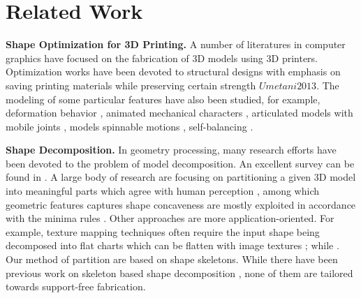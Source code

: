 \section{Related Work}

\textbf{Shape Optimization for 3D Printing.} A number of literatures in computer graphics have focused on the fabrication of 3D models using 3D printers. Optimization works have been devoted to structural designs with emphasis on saving printing materials while preserving certain strength \cite{StavaVBCM12,ZhouPZ13,WangWYLTTDCL13,LuSZWFCSTCC14} $Umetani2013$. The modeling of some particular features have also been studied, for example, deformation behavior \cite{SkourasTCBG13}, animated mechanical characters \cite{CorosTNSFSMB13,CeylanLMAP13}, articulated models with mobile joints \cite{BacherBJP12,CaliCAKSKW12}, models spinnable motions \cite{Bacher14}, self-balancing \cite{PrevostWLS13}.

\textbf{Shape Decomposition.} In geometry processing, many research efforts have been devoted to the problem of model decomposition. An excellent survey can be found in \cite{Shamir08}. A large body of research are focusing on partitioning a given 3{D} model into meaningful parts which agree with human perception \cite{KatzT03,KatzLT05,JiLCW06,LiuZ07,Golovinskiy:2008,ChenGF09,KaickFKAC14}, among which geometric features captures shape concaveness are mostly exploited in accordance with the minima rules \cite{hoffman1984parts,hoffman1997salience}. Other approaches are more application-oriented. For example, texture mapping techniques often require the input shape being decomposed into flat charts which can be flatten with image textures \cite{zhou2004iso,}; while . Our method of partition are based on shape skeletons. While there have been previous work on skeleton based shape decomposition \cite{lien2006simultaneous,reniers2007skeleton,AuTCCL08}, none of them are tailored towards support-free fabrication.

